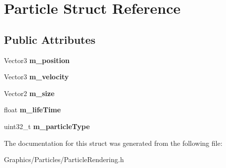 \hypertarget{structParticle}{}\section{Particle Struct Reference}
\label{structParticle}
\subsection*{Public Attributes}
\begin{DoxyCompactItemize}
\item 
\mbox{\label{structParticle_aa75c70c386148e4d3a661a261ee2ae11}} 
Vector3 {\bfseries m\+\_\+position}
\item 
\mbox{\label{structParticle_abcc28ba0c8b2a30a61255fe7f688d31d}} 
Vector3 {\bfseries m\+\_\+velocity}
\item 
\mbox{\label{structParticle_a3a1c32035681ecb166208e1579000f37}} 
Vector2 {\bfseries m\+\_\+size}
\item 
\mbox{\label{structParticle_a4b6f55302e7647d291eddbb6f671dad4}} 
float {\bfseries m\+\_\+life\+Time}
\item 
\mbox{\label{structParticle_a7fbb5694b020fac088e29a4112e81b62}} 
uint32\+\_\+t {\bfseries m\+\_\+particle\+Type}
\end{DoxyCompactItemize}


The documentation for this struct was generated from the following file\+:\begin{DoxyCompactItemize}
\item 
Graphics/\+Particles/Particle\+Rendering.\+h\end{DoxyCompactItemize}
